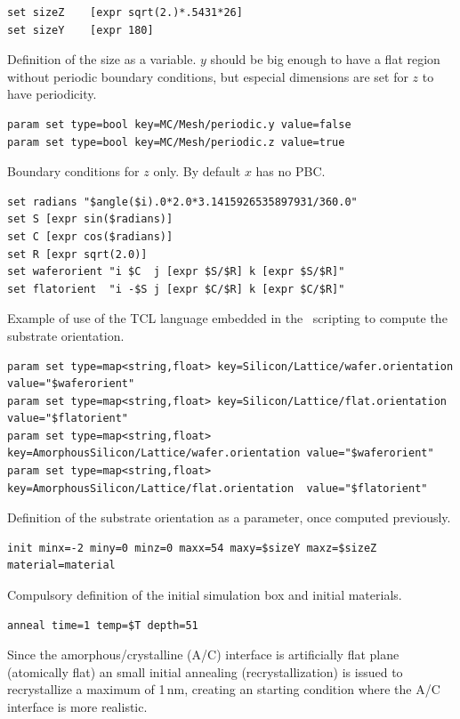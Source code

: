 \begin{lstlisting}[firstnumber=23]
set sizeZ    [expr sqrt(2.)*.5431*26]
set sizeY    [expr 180]
\end{lstlisting}
Definition of the size as a variable. $y$ should be big enough to have a flat region without periodic boundary conditions, but especial dimensions are set for $z$ to have periodicity.

\begin{lstlisting}[firstnumber=26]
param set type=bool key=MC/Mesh/periodic.y value=false
param set type=bool key=MC/Mesh/periodic.z value=true
\end{lstlisting}
Boundary conditions for $z$ only. By default $x$ has no PBC.

\begin{lstlisting}[firstnumber=29]
set radians "$angle($i).0*2.0*3.1415926535897931/360.0"
set S [expr sin($radians)]
set C [expr cos($radians)]
set R [expr sqrt(2.0)]
set waferorient "i $C  j [expr $S/$R] k [expr $S/$R]"
set flatorient  "i -$S j [expr $C/$R] k [expr $C/$R]"
\end{lstlisting}
Example of use of the TCL language embedded in the \MMonCa\ scripting to compute the substrate orientation.

\begin{lstlisting}[firstnumber=36]
param set type=map<string,float> key=Silicon/Lattice/wafer.orientation value="$waferorient"
param set type=map<string,float> key=Silicon/Lattice/flat.orientation  value="$flatorient" 
param set type=map<string,float> key=AmorphousSilicon/Lattice/wafer.orientation value="$waferorient"
param set type=map<string,float> key=AmorphousSilicon/Lattice/flat.orientation  value="$flatorient" 
\end{lstlisting}
Definition of the substrate orientation as a parameter, once computed previously.

\begin{lstlisting}[firstnumber=41]
init minx=-2 miny=0 minz=0 maxx=54 maxy=$sizeY maxz=$sizeZ material=material
\end{lstlisting}
Compulsory definition of the initial simulation box and initial materials.

\begin{lstlisting}[firstnumber=43]
anneal time=1 temp=$T depth=51
\end{lstlisting}
Since the amorphous/crystalline (A/C) interface is artificially flat plane (atomically flat) an small initial annealing (recrystallization) is issued to recrystallize a maximum of 1\,nm, creating an starting condition where the A/C interface is more realistic. 

